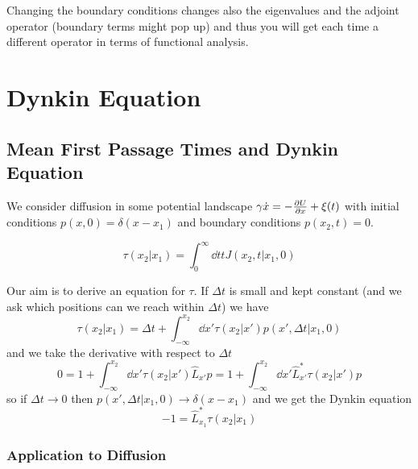 \documentclass{notebook}
\begin{document}
\begin{remark}
	Changing the boundary conditions changes also the eigenvalues and the adjoint operator (boundary terms might pop up) and thus you will get each time a different operator in terms of functional analysis. 
\end{remark}

\chapter{Dynkin Equation}

\section{Mean First Passage Times and Dynkin Equation}

We consider diffusion in some potential landscape $\gamma \dot{x} = - \pdv{U}{x} + \xi(t)$ with initial conditions $p(x,0) = \delta(x-x_1)$ and boundary conditions $p(x_2,t) = 0$.

\begin{theorem}
	\begin{equation}
	\tau(x_2|x_1) = \int_0^{\infty} \dd{t} t J(x_2,t|x_1,0)
	\end{equation}
\end{theorem}

Our aim is to derive an equation for $\tau$. If $\Delta t$ is small and kept constant (and we ask which positions can we reach within $\Delta t$) we have
%
\begin{equation*}
	\tau(x_2|x_1) = \Delta t + \int_{-\infty}^{x_2} \dd{x'} \tau(x_2|x') p(x',\Delta t|x_1,0)
\end{equation*}
%
and we take the derivative with respect to $\Delta t$
%
\begin{equation*}
	0 = 1 + \int_{-\infty}^{x_2} \dd{x'} \tau(x_2|x') \hat{L}_{x'} p = 1 + \int_{-\infty}^{x_2} \dd{x'} \hat{L}^*_{x'} \tau(x_2|x') p
\end{equation*}
%
so if $\Delta t \to 0$ then $p(x',\Delta t|x_1,0) \to \delta(x-x_1)$
and we get the Dynkin equation
%
\begin{equation}
-1 = \hat{L}^*_{x_1} \tau(x_2|x_1)
\end{equation}
%

\subsection*{Application to Diffusion}
\end{document}
